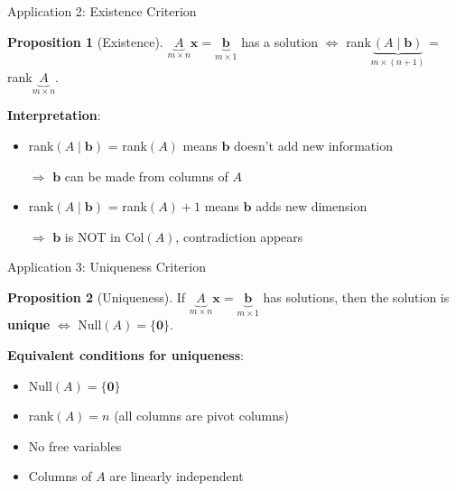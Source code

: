 \documentclass[10pt]{beamer}
\theoremstyle{definition}
\newtheorem{prop}{Proposition}[section]
\newcommand{\x}[1]{\alert{\textbf{#1}}}
\begin{document}
\begin{frame}{Application 2: Existence Criterion}

\begin{prop}[Existence]
$\underbrace{A}_{m \times n}\mathbf{x} = \underbrace{\mathbf{b}}_{m \times 1}$ has a solution $\iff$ rank$\underbrace{(A \mid \mathbf{b})}_{m \times (n+1)}$ = rank$\underbrace{A}_{m \times n}$.
\end{prop}

\vspace{1em}

\x{Interpretation}:

\begin{itemize}
\item rank$(A \mid \mathbf{b})$ = rank$(A)$ means $\mathbf{b}$ doesn't add new information

$\Rightarrow$ $\mathbf{b}$ can be made from columns of $A$

\item rank$(A \mid \mathbf{b})$ = rank$(A) + 1$ means $\mathbf{b}$ adds new dimension

$\Rightarrow$ $\mathbf{b}$ is NOT in $\text{Col}(A)$, contradiction appears
\end{itemize}

\end{frame}

\begin{frame}{Application 3: Uniqueness Criterion}

\begin{prop}[Uniqueness]
If $\underbrace{A}_{m \times n}\mathbf{x} = \underbrace{\mathbf{b}}_{m \times 1}$ has solutions, then the solution is \x{unique} $\iff$ $\text{Null}(A) = \{\mathbf{0}\}$.
\end{prop}

\vspace{1em}

\x{Equivalent conditions for uniqueness}:

\begin{itemize}
\item $\text{Null}(A) = \{\mathbf{0}\}$
\item rank$(A) = n$ (all columns are pivot columns)
\item No free variables
\item Columns of $A$ are linearly independent
\end{itemize}

\end{frame}
\end{document}
